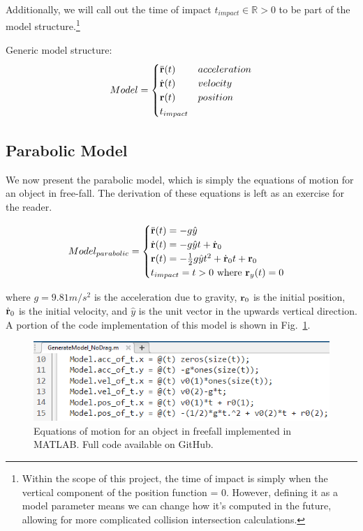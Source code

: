 Additionally, we will call out the time of impact $t_{impact} \in \mathbb{R} > 0$ to be part of the model structure.\footnote{Within the scope of this project, the time of impact is simply when the vertical component of the position function = 0. However, defining it as a model parameter means we can change how it's computed in the future, allowing for more complicated collision intersection calculations.}

Generic model structure:
\begin{align*}
Model =
\begin{cases} 
\ddot{\bf r}(t) & acceleration \\
\dot{\bf r}(t) & velocity \\
{\bf r}(t) & position \\
t_{impact}
\end{cases}
\end{align*}

\subsection{Parabolic Model}
We now present the parabolic model, which is simply the equations of motion for an object in free-fall. The derivation of these equations is left as an exercise for the reader.

\begin{align*}
Model_{parabolic} = 
\begin{cases}
\ddot{\bf r}(t) = -g\hat{y} \\
\dot{\bf r}(t) = -g\hat{y}t + \dot{\bf r}_0 \\
{\bf r}(t) = -\frac12g\hat{y}t^2 + \dot{\bf r}_0t + {\bf r}_0 \\
t_{impact} = t > 0\text{ where }{\bf r}_y(t) = 0
\end{cases}
\end{align*}

where $g=9.81m/s^2$ is the acceleration due to gravity, ${\bf r}_0$ is the initial position, $\dot{\bf r}_0$ is the initial velocity, and $\hat{y}$ is the unit vector in the upwards vertical direction. A portion of the code implementation of this model is shown in Fig.~\ref{fig:model_matlab_code_nodrag}.

\begin{figure}[t]
\centering
\includegraphics[width=0.9\linewidth]{images/model_matlab_code_nodrag.png}
\caption{\label{fig:model_matlab_code_nodrag} Equations of motion for an object in freefall implemented in MATLAB. Full code available on GitHub.}
\end{figure}







